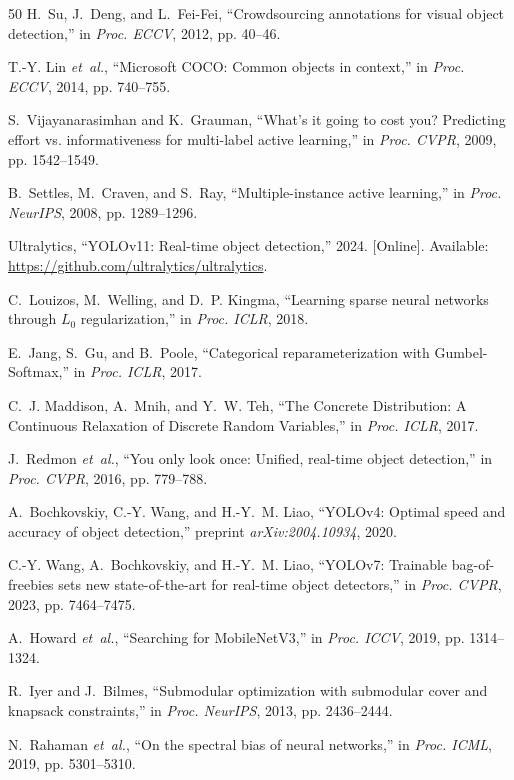 \documentclass[conference]{IEEEtran}
\begin{document}
\begin{thebibliography}{50}
H.~Su, J.~Deng, and L.~Fei-Fei, ``Crowdsourcing annotations for visual object detection,'' in \emph{Proc. ECCV}, 2012, pp. 40--46.

T.-Y. Lin \emph{et~al.}, ``Microsoft COCO: Common objects in context,'' in \emph{Proc. ECCV}, 2014, pp. 740--755.

S.~Vijayanarasimhan and K.~Grauman, ``What's it going to cost you? Predicting effort vs. informativeness for multi-label active learning,'' in \emph{Proc. CVPR}, 2009, pp. 1542--1549.

B.~Settles, M.~Craven, and S.~Ray, ``Multiple-instance active learning,'' in \emph{Proc. NeurIPS}, 2008, pp. 1289--1296.

Ultralytics, ``YOLOv11: Real-time object detection,'' 2024. [Online]. Available: \url{https://github.com/ultralytics/ultralytics}.

C.~Louizos, M.~Welling, and D.~P. Kingma, ``Learning sparse neural networks through $L_0$ regularization,'' in \emph{Proc. ICLR}, 2018.

E.~Jang, S.~Gu, and B.~Poole, ``Categorical reparameterization with Gumbel-Softmax,'' in \emph{Proc. ICLR}, 2017.

C.~J. Maddison, A.~Mnih, and Y.~W. Teh, ``The Concrete Distribution: A Continuous Relaxation of Discrete Random Variables,'' in \emph{Proc. ICLR}, 2017.

J.~Redmon \emph{et~al.}, ``You only look once: Unified, real-time object detection,'' in \emph{Proc. CVPR}, 2016, pp. 779--788.

A.~Bochkovskiy, C.-Y. Wang, and H.-Y.~M. Liao, ``YOLOv4: Optimal speed and accuracy of object detection,'' preprint \emph{arXiv:2004.10934}, 2020.

C.-Y. Wang, A.~Bochkovskiy, and H.-Y.~M. Liao, ``YOLOv7: Trainable bag-of-freebies sets new state-of-the-art for real-time object detectors,'' in \emph{Proc. CVPR}, 2023, pp. 7464--7475.

A.~Howard \emph{et~al.}, ``Searching for MobileNetV3,'' in \emph{Proc. ICCV}, 2019, pp. 1314--1324.

R.~Iyer and J.~Bilmes, ``Submodular optimization with submodular cover and knapsack constraints,'' in \emph{Proc. NeurIPS}, 2013, pp. 2436--2444.

N.~Rahaman \emph{et~al.}, ``On the spectral bias of neural networks,'' in \emph{Proc. ICML}, 2019, pp. 5301--5310.

\end{thebibliography}
\end{document}
